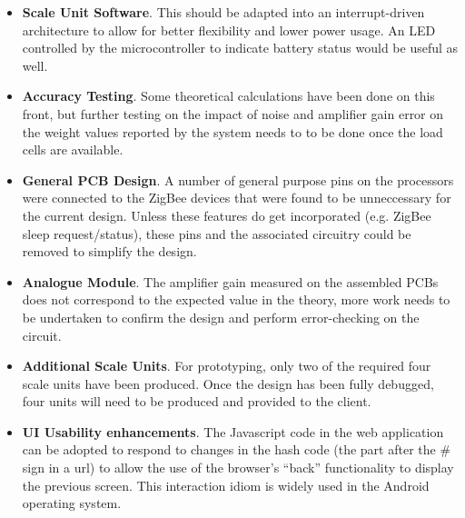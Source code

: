 \begin{itemize}
	\item \textbf{Scale Unit Software}. This should be adapted into an interrupt-driven architecture to allow for better flexibility and lower power usage. An LED controlled by the microcontroller to indicate battery status would be useful as well.
	\item \textbf{Accuracy Testing}. Some theoretical calculations have been done on this front, but further testing on the impact of noise and amplifier gain error on the weight values reported by the system needs to to be done once the load cells are available.
	\item \textbf{General PCB Design}. A number of general purpose pins on the processors were connected to the ZigBee devices that were found to be unneccessary for the current design. Unless these features do get incorporated (e.g. ZigBee sleep request/status), these pins and the associated circuitry could be removed to simplify the design.
	\item \textbf{Analogue Module}. The amplifier gain measured on the assembled PCBs does not correspond to the expected value in the theory, more work needs to be undertaken to confirm the design and perform error-checking on the circuit.
	\item \textbf{Additional Scale Units}. For prototyping, only two of the required four scale units have been produced. Once the design has been fully debugged, four units will need to be produced and provided to the client.
	\item \textbf{UI Usability enhancements}. The Javascript code in the web application can be adopted to respond to changes in the hash code (the part after the \# sign in a url) to allow the use of the browser's ``back'' functionality to display the previous screen. This interaction idiom is widely used in the Android operating system.
\end{itemize}

